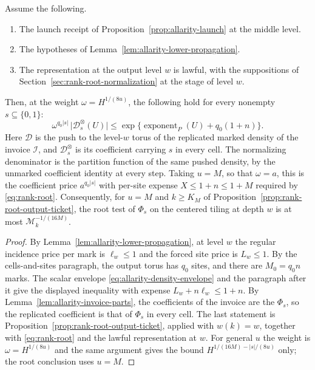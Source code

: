 \begin{proposition}
\label{prop:allarity-output-price}
Assume the following.
\begin{enumerate}
\item The launch receipt of Proposition~\ref{prop:allarity-launch} at the
 middle level.
\item The hypotheses of Lemma~\ref{lem:allarity-lower-propagation}.
\item The representation at the output level $w$ is lawful, with the
 suppositions of Section~\ref{sec:rank-root-normalization} at the stage
 of level $w$.
\end{enumerate}
Then, at the weight $\omega=H^{1/(8u)}$, the following hold for every
nonempty $s\subseteq\{0,1\}$:
\[
 \omega^{q_0|s|}\,\bigl|\mathcal D_s^{\otimes}(U)\bigr|
 \le\exp\{\operatorname{exponent}_P(U)+q_0(1+n)\}.
\]
Here $\mathcal D$ is the push to the level-$w$ torus of the replicated
marked density of the invoice $\mathcal I$, and $\mathcal D_s^{\otimes}$
is its coefficient carrying $s$ in every cell. The normalizing
denominator is the partition function of the same pushed density, by the
unmarked coefficient identity at every step. Taking $u=M$, so that
$\omega=a$, this is the coefficient price $a^{q_0|s|}$ with per-site
expense $X\le1+n\le1+M$ required by \eqref{eq:rank-root}. Consequently,
for $u=M$ and $k\ge K_M$ of Proposition~\ref{prop:rank-root-output-ticket},
the root test of $\Phi_s$ on the centered tiling at depth $w$ is at most
$\mathcal M_k^{-1/(16M)}$.
\end{proposition}
\begin{proof}
By Lemma~\ref{lem:allarity-lower-propagation}, at level $w$ the regular
incidence price per mark is $\ell_w\le1$ and the forced site price is
$L_w\le1$. By the cells-and-sites paragraph, the output torus has $q_0$
sites, and there are $M_0=q_0n$ marks. The scalar envelope
\eqref{eq:allarity-density-envelope} and the paragraph after it give the
displayed inequality with expense $L_w+n\ell_w\le1+n$. By
Lemma~\ref{lem:allarity-invoice-parts}, the coefficients of the
invoice are the $\Phi_s$, so the replicated coefficient is that of
$\Phi_s$ in every cell. The last statement is
Proposition~\ref{prop:rank-root-output-ticket}, applied with $w(k)=w$,
together with \eqref{eq:rank-root} and the lawful representation at $w$.
For general $u$ the weight is $\omega=H^{1/(8u)}$ and the same argument
gives the bound $H^{1/(16M)-|s|/(8u)}$ only; the root conclusion uses
$u=M$.
\end{proof}


